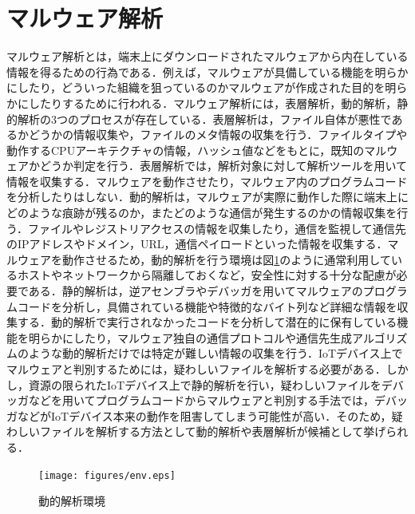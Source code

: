 \section{マルウェア解析}
マルウェア解析とは，端末上にダウンロードされたマルウェアから内在している情報を得るための行為である．例えば，マルウェアが具備している機能を明らかにしたり，どういった組織を狙っているのかマルウェアが作成された目的を明らかにしたりするために行われる．マルウェア解析には，表層解析，動的解析，静的解析の3つのプロセスが存在している．\cite{実践}表層解析は，ファイル自体が悪性であるかどうかの情報収集や，ファイルのメタ情報の収集を行う．ファイルタイプや動作するCPUアーキテクチャの情報，ハッシュ値などをもとに，既知のマルウェアかどうか判定を行う．表層解析では，解析対象に対して解析ツールを用いて情報を収集する．マルウェアを動作させたり，マルウェア内のプログラムコードを分析したりはしない．動的解析は，マルウェアが実際に動作した際に端末上にどのような痕跡が残るのか，またどのような通信が発生するのかの情報収集を行う．ファイルやレジストリアクセスの情報を収集したり，通信を監視して通信先のIPアドレスやドメイン，URL，通信ペイロードといった情報を収集する．マルウェアを動作させるため，動的解析を行う環境は図\ref{fig:env}のように通常利用しているホストやネットワークから隔離しておくなど，安全性に対する十分な配慮が必要である．静的解析は，逆アセンブラやデバッガを用いてマルウェアのプログラムコードを分析し，具備されている機能や特徴的なバイト列など詳細な情報を収集する．動的解析で実行されなかったコードを分析して潜在的に保有している機能を明らかにしたり，マルウェア独自の通信プロトコルや通信先生成アルゴリズムのような動的解析だけでは特定が難しい情報の収集を行う．IoTデバイス上でマルウェアと判別するためには，疑わしいファイルを解析する必要がある．しかし，資源の限られたIoTデバイス上で静的解析を行い，疑わしいファイルをデバッガなどを用いてプログラムコードからマルウェアと判別する手法では，デバッガなどがIoTデバイス本来の動作を阻害してしまう可能性が高い．そのため，疑わしいファイルを解析する方法として動的解析や表層解析が候補として挙げられる．

\newpage

\begin{figure}[h]
   \centering
      \texttt{[image: figures/env.eps]}
      \caption{動的解析環境}
   \label{fig:env}   
\end{figure}

